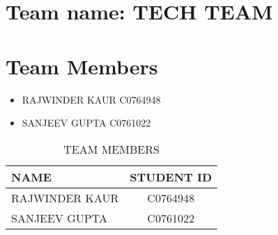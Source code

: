 \section * {Team name: TECH TEAM}

\section * {Team Members}

\begin{itemize}
    \item   RAJWINDER KAUR  C0764948
    \item   SANJEEV GUPTA C0761022
\end{itemize}

\begin{table}
\begin{tabular}{l | c }
NAME & STUDENT ID \\
\hline \hline
RAJWINDER KAUR & C0764948 \\ 
SANJEEV GUPTA & C0761022\\
\end{tabular}
\caption{TEAM MEMBERS}
\end{table}
